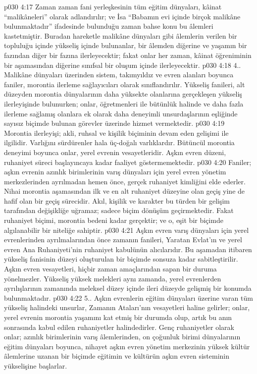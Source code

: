 \vs p030 4:17 Zaman zaman fani yerleşkesinin tüm eğitim dünyaları, kâinat “malikâneleri” olarak adlandırılır; ve İsa “Babamın evi içinde birçok malikâne bulunmaktadır” ifadesinde bulunduğu zaman bahse konu bu âlemleri kastetmiştir. Buradan hareketle malikâne dünyaları gibi âlemlerin verilen bir topluluğu içinde yükseliş içinde bulunanlar, bir âlemden diğerine ve yaşamın bir fazından diğer bir fazına ilerleyecektir; fakat onlar her zaman, kâinat öğreniminin bir aşamasından diğerine sınıfsal bir oluşum içinde ilerleyecektir.
\vs p030 4:18 4.\bibnobreakspace {}. Malikâne dünyaları üzerinden sistem, takımyıldız ve evren alanları boyunca faniler, morontia ilerleme sağlayıcıları olarak sınıflandırılır. Yükseliş fanileri, alt düzeyden morontia dünyalarının daha yüksekte olanlarına gerçekleşen yükseliş ilerleyişinde bulunurken; onlar, öğretmenleri ile bütünlük halinde ve daha fazla ilerleme sağlamış olanlara ek olarak daha deneyimli unsurdaşlarının eşliğinde sayısız biçimde bulunan görevler üzerinde hizmet vermektedir.
\vs p030 4:19 Morontia ilerleyişi; akli, ruhsal ve kişilik biçiminin devam eden gelişimi ile ilgilidir. Varlığını sürdürenler hala üç\hyp{}doğalı varlıklardır. Bütüncül morontia deneyimi boyunca onlar, yerel evrenin vesayetleridir. Aşkın evren düzeni, ruhaniyet süreci başlayıncaya kadar faaliyet göstermemektedir.
\vs p030 4:20 Faniler; aşkın evrenin azınlık birimlerinin varış dünyaları için yerel evren yönetim merkezlerinden ayrılmadan hemen önce, gerçek ruhaniyet kimliğini elde ederler. Nihai morontia aşamasından ilk ve en alt ruhaniyet düzeyine olan geçiş yine de hafif olan bir geçiş sürecidir. Akıl, kişilik ve karakter bu türden bir gelişim tarafından değişikliğe uğramaz; sadece biçim dönüşüm geçirmektedir. Fakat ruhaniyet biçimi, morontia bedeni kadar gerçektir; ve o, eşit bir biçimde algılanabilir bir niteliğe sahiptir.
\vs p030 4:21 Aşkın evren varış dünyaları için yerel evrenlerinden ayrılmalarından önce zamanın fanileri, Yaratan Evlat’ın ve yerel evren Ana Ruhaniyeti’nin ruhaniyet kabulünün alıcılarıdır. Bu aşamadan itibaren yükseliş fanisinin düzeyi oluşturulan bir biçimde sonsuza kadar sabitleştirilir. Aşkın evren vesayetleri, hiçbir zaman amaçlarından sapan bir duruma yönelmezler. Yükseliş yüksek melekleri aynı zamanda, yerel evrenlerden ayrılışlarının zamanında meleksel düzey içinde ileri düzeyde gelişmiş bir konumda bulunmaktadır.
\vs p030 4:22 5.\bibnobreakspace {}. Aşkın evrenlerin eğitim dünyaları üzerine varan tüm yükseliş halindeki unsurlar, Zamanın Ataları’nın vesayetleri haline gelirler; onlar, yerel evrenin morontia yaşamını kat etmiş bir durumda olup, artık bu anın sonrasında kabul edilen ruhaniyetler halindedirler. Genç ruhaniyetler olarak onlar; azınlık birimlerinin varış âlemlerinden, on çoğunluk birimi dünyalarının eğitim dünyaları boyunca, nihayet aşkın evren yönetim merkezinin yüksek kültür âlemlerine uzanan bir biçimde eğitimin ve kültürün aşkın evren sisteminin yükselişine başlarlar.
